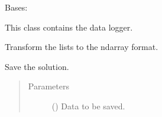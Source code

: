 \documentclass[letterpaper,10pt,english]{sphinxmanual}
\begin{document}
\begin{fulllineitems}
\label{\detokenize{control:control.common.Datalogger}}
\pysigstartsignatures
{}
\pysigstopsignatures
\sphinxAtStartPar
Bases: 

\sphinxAtStartPar
This class contains the data logger.

\begin{fulllineitems}
\label{\detokenize{control:control.common.Datalogger.post_process}}
\pysigstartsignatures
{}
\pysigstopsignatures
\sphinxAtStartPar
Transform the lists to the ndarray format.

\end{fulllineitems}


\begin{fulllineitems}
\label{\detokenize{control:control.common.Datalogger.save}}
\pysigstartsignatures
{}
\pysigstopsignatures
\sphinxAtStartPar
Save the solution.
\begin{quote}\begin{description}
\item[{Parameters}] \leavevmode
\sphinxAtStartPar
{} () \textendash{} Data to be saved.

\end{description}\end{quote}

\end{fulllineitems}


\end{fulllineitems}

\end{document}
